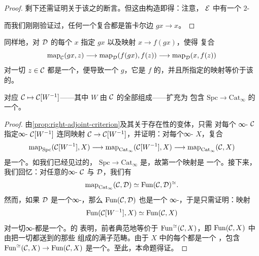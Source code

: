 \begin{proof}
剩下还需证明关于该\trAdjunction{}之\trCounit{}的断言。但这由构造即得：注意，
$\mathcal{E}$ 中有一个 $2$-\trSimplex{}%
\begin{center}
\end{center}
而我们刚刚验证过，任何一个复合都是笛卡尔边 $gx \to x$。
\end{proof}

\begin{remark}\label{rem:left-adjoint-criterion}
同样地，对 $\mathcal{D}$ 的每个\trObject{} $x$ 指定 $gx$ 以及映射 $x \to f(gx)$，使得
复合
\[
\mathrm{map}_{\mathcal{C}}(gx, z) \longrightarrow \mathrm{map}_{\mathcal{D}}(f(gx), f(z))
  \longrightarrow \mathrm{map}_{\mathcal{D}}(x, f(z))
\]
对一切 $z \in \mathcal{C}$ 都是一个\trEquivalence{}，便导致一个\trFunctor{} $g$，它是
$f$ 的\trLeftAdjoint{}，并且所指定的映射等价于该\trAdjunction{}的\trUnit{}。
\end{remark}

\begin{proposition}\label{prop:free-groupoid-left-adjoint}
对应 $\mathcal{C} \mapsto \mathcal{C}[W^{-1}]$——其中 $W$ 由 $\mathcal{C}$ 的全部\trMorphism{}组成——扩充为
包含 $\mathrm{Spc} \to \mathrm{Cat}_{\infty}$ 的一个\trLeftAdjoint{}。
\end{proposition}

\begin{proof}
由\cref{prop:right-adjoint-criterion}及其关于\trLeftAdjoint{}存在性的变体，只需
对每个
∞-\trCategory{} $\mathcal{C}$ 指定∞-\trGroupoid{} $\mathcal{C}[W^{-1}]$ 连同映射
$\mathcal{C} \to \mathcal{C}[W^{-1}]$，并证明：对每个∞-\trGroupoid{} $X$，复合
\[
\mathrm{map}_{\mathrm{Spc}}(\mathcal{C}[W^{-1}], X)
  \longrightarrow \mathrm{map}_{\mathrm{Cat}_{\infty}}(\mathcal{C}[W^{-1}], X)
  \longrightarrow \mathrm{map}_{\mathrm{Cat}_{\infty}}(\mathcal{C}, X)
\]
是一个\trEquivalence{}。如我们已经见过的，\trFunctor{}%
$\mathrm{Spc} \to \mathrm{Cat}_{\infty}$ 是\trFullyFaithful{}，故第一个映射是
一个\trEquivalence{}。接下来，我们回忆：对任意的∞-\trCategories{} $\mathcal{C}$ 与
$\mathcal{D}$，我们有
\[
\mathrm{map}_{\mathrm{Cat}_{\infty}}(\mathcal{C}, \mathcal{D}) \simeq
  \mathrm{Fun}(\mathcal{C}, \mathcal{D})^{\simeq}.
\]
然而，如果 $\mathcal{D}$ 是一个∞-\trGroupoid{}，那么 $\mathrm{Fun}(\mathcal{C}, \mathcal{D})$ 也是一个
∞-\trGroupoid{}，于是只需证明：映射
\[
\mathrm{Fun}(\mathcal{C}[W^{-1}], X) \simeq \mathrm{Fun}(\mathcal{C}, X)
\]
对一切∞-\trGroupoid{}都是一个\trEquivalence{}。\trLocalization{}的%
\trUniversalProperty{}表明，前者典范地等价于 $\mathrm{Fun}^{\simeq}(\mathcal{C}, X)$，即
$\mathrm{Fun}(\mathcal{C}, X)$ 中由把一切\trMorphism{}都送到\trEquivalence{}的那些%
\trFunctor{}组成的满子范畴。由于 $X$ 中的每个\trMorphism{}都是一个%
\trEquivalence{}，包含 $\mathrm{Fun}^{\simeq}(\mathcal{C}, X) \to \mathrm{Fun}(\mathcal{C}, X)$
是一个\trEquivalence{}。至此，本命题得证。
\end{proof}

